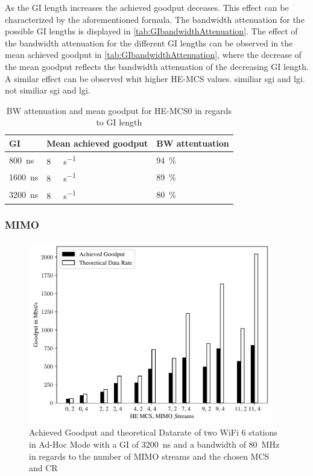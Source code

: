 As the \ac{GI} length increases the achieved goodput deceases. This effect can be characterized by the aforementioned formula.
The bandwidth attenuation for the possible \ac{GI} lengths is displayed in \autoref{tab:GIbandwidthAttenuation}.
The effect of the bandwidth attenuation for the different \ac{GI} lengths can be observed in the mean achieved goodput in
\autoref{tab:GIbandwidthAttenuation}, where the decrease of the mean goodput reflects the bandwidth attenuation of the decreasing \ac{GI} length.
A similar effect can be observed whit higher HE-\ac{MCS} values.
\textcite{Pravinkumar Patil} similiar sgi and lgi.
\textcite{Prasad} not similiar sgi and lgi.
\begin{table}[H]
	\centering
	\begin{tabular}{>{\centering}p{3cm}p{4cm}p{4cm}}
		\toprule
		\ac{GI} & Mean achieved goodput & \ac{BW} attentuation\\
		\midrule
		\SI{800}{\nano\second} & \SI{8}{\giga\bit\per\second}&
		\SI{94}{\percent} \\
		\SI{1600}{\nano\second} &
		\SI{8}{\giga\bit\per\second}&
		\SI{89}{\percent} \\
		\SI{3200}{\nano\second} & \SI{8}{\giga\bit\per\second}&
		\SI{80}{\percent} \\
		\bottomrule
	\end{tabular}
	\caption{\ac{BW} attenuation and mean goodput for HE-\ac{MCS}0 in regards to \ac{GI} length}
	\label{tab:GIbandwidthAttenuation}
\end{table}

\subsubsection*{\acl{MIMO}}

\begin{figure}%
	\centering
	\includegraphics[width=0.95\textwidth]{figures/mimo_dataRate_simulation.pdf}
	\caption{Achieved Goodput and theoretical Datarate of two WiFi 6 stations in Ad-Hoc Mode with a \ac{GI} of \SI{3200}{\nano\second} and a bandwidth of \SI{80}{\mega\hertz} in regards to the number of \ac{MIMO} streams and the chosen \ac{MCS} and \ac{CR}}%
	\label{fig:Data_rate_Mimo}%
\end{figure}

